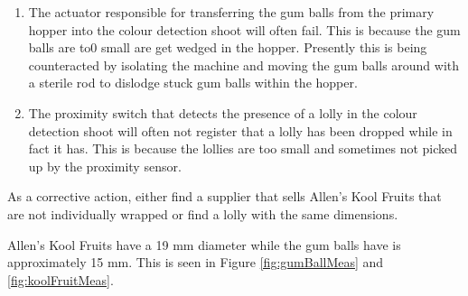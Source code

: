 			\begin{enumerate}
				\item The actuator responsible for transferring the gum balls from the primary hopper into the colour detection shoot will often fail. This is because the gum balls are to0 small are get wedged in the hopper. Presently this is being counteracted by isolating the machine and moving the gum balls around with a sterile rod to dislodge stuck gum balls within the hopper.
				\item The proximity switch that detects the presence of a lolly in the colour detection shoot will often not register that a lolly has been dropped while in fact it has. This is because the lollies are too small and sometimes not picked up by the proximity sensor. 
			\end{enumerate}
			
			As a corrective action, either find a supplier that sells Allen's Kool Fruits that are not individually wrapped or find a lolly with the same dimensions.
			
			Allen's Kool Fruits have a 19 mm diameter while the gum balls have is approximately 15 mm. This is seen in Figure \ref{fig:gumBallMeas} and \ref{fig:koolFruitMeas}.

